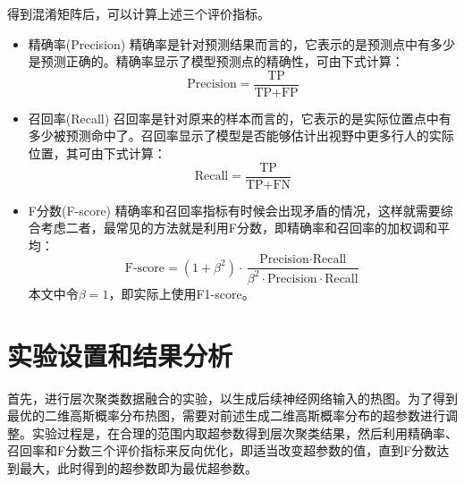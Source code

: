 得到混淆矩阵后，可以计算上述三个评价指标。
\begin{itemize}
    \item 精确率(Precision) 精确率是针对预测结果而言的，它表示的是预测点中有多少是预测正确的。精确率显示了模型预测点的精确性，可由下式计算：
        \begin{equation}
            \text{Precision}=\frac{\text{TP}}{\text{TP}+\text{FP}}
        \end{equation}
    \item 召回率(Recall) 召回率是针对原来的样本而言的，它表示的是实际位置点中有多少被预测命中了。召回率显示了模型是否能够估计出视野中更多行人的实际位置，其可由下式计算：
    \begin{equation}
        \text{Recall}=\frac{\text{TP}}{\text{TP}+\text{FN}}
    \end{equation}
    \item F分数(F-score) 精确率和召回率指标有时候会出现矛盾的情况，这样就需要综合考虑二者，最常见的方法就是利用F分数，即精确率和召回率的加权调和平均：
    \begin{equation}
        \text{F-score}=(1+\beta^2)\cdot \frac{\text{Precision} \cdot \text{Recall}}{\beta^2 \cdot \text{Precision} \cdot \text{Recall}}
    \end{equation}
    本文中令$\beta=1$，即实际上使用F1-score。
\end{itemize}

\section{实验设置和结果分析}

首先，进行层次聚类数据融合的实验，以生成后续神经网络输入的热图。为了得到最优的二维高斯概率分布热图，需要对前述生成二维高斯概率分布的超参数进行调整。实验过程是，在合理的范围内取超参数得到层次聚类结果，然后利用精确率、召回率和F分数三个评价指标来反向优化，即适当改变超参数的值，直到F分数达到最大，此时得到的超参数即为最优超参数。

